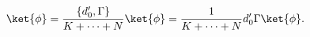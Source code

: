 \begin{equation}
%
\ket{\phi}      = \frac{\{ d'_{0}, \Gamma \}}{K+\cdots+N} \ket{\phi}
                = \frac{1}{K+\cdots+N} d'_{0} \Gamma \ket{\phi}.
%
\end{equation}

